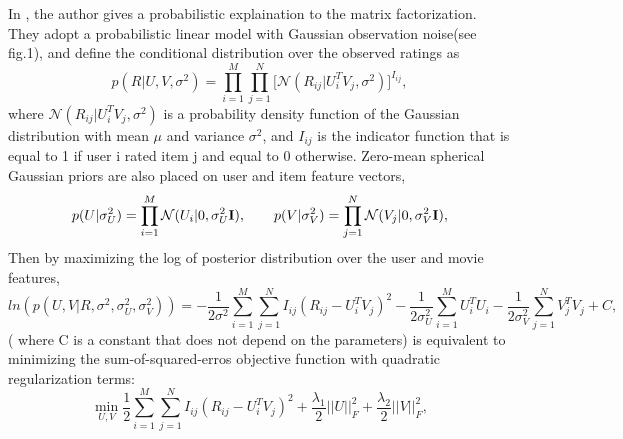 \documentclass[10pt,onecolumn,conference]{IEEEtran}
\begin{document}
In \cite{mnih2007probabilistic}, the author gives a probabilistic explaination to the matrix factorization. They adopt a probabilistic linear model with Gaussian observation noise(see fig.1), and define the conditional distribution over the observed ratings as
\begin{equation}
p(R|U,V,\sigma^2) = \prod_{i=1}^{M}\prod_{j=1}^{N}\big[\mathcal{N}(R_{ij}|U_i^TV_j,\sigma^2)\big]^{I_{ij}},
\end{equation} 
where $\mathcal{N}(R_{ij}|U_i^TV_j,\sigma^2)$ is a probability density function of the Gaussian distribution with mean $\mu$ and variance $\sigma^2$, and $I_{ij}$ is the indicator function that is equal to 1 if user i rated item j and equal to 0 otherwise. Zero-mean spherical Gaussian priors are also placed on user and item feature vectors, 
\begin{equation}
p(U|\sigma_U^2) = \prod_{i=1}^{M}\mathcal{N}(U_{i}|0,\sigma_U^2\bold{I}),\quad\quad
p(V|\sigma_V^2) = \prod_{j=1}^{N}\mathcal{N}(V_{j}|0,\sigma_V^2\bold{I}),
\end{equation} 
Then by maximizing the log of posterior distribution over the user and movie features,
\begin{equation}
ln(p(U,V|R, \sigma^2,\sigma_U^2,\sigma_V^2)) = -\frac{1}{2\sigma^2}\sum_{i=1}^{M}\sum_{j=1}^{N}I_{ij}(R_{ij} - U_i^TV_j)^2 - \frac{1}{2\sigma_U^2}\sum_{i=1}^{M}U_i^TU_i - \frac{1}{2\sigma_V^2}\sum_{j=1}^{N}V_j^TV_j + C,
\end{equation} 
( where C is a constant that does not depend on the parameters) is equivalent to minimizing the sum-of-squared-erros objective function with quadratic regularization terms:
\begin{equation}
\min_{U,V}\frac{1}{2}\sum_{i=1}^{M}\sum_{j=1}^{N}I_{ij}(R_{ij} - U_i^TV_j)^2 + \frac{\lambda_1}{2}||U||_F^2 + \frac{\lambda_2}{2}||V||_F^2,
\end{equation} 
\end{document}
